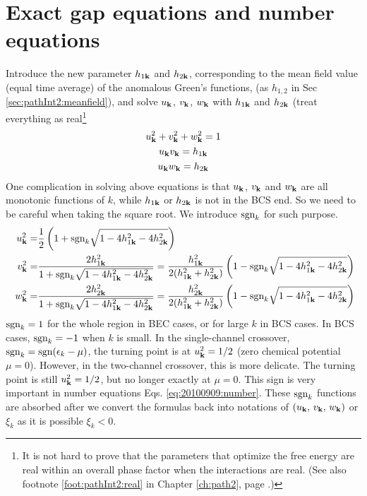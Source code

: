  \section{Exact gap equations and number equations}
Introduce the new parameter $h_{1\mathbf{k}}$ and $h_{2\mathbf{k}}$, corresponding to the mean field value (equal time average) of the anomalous Green's functions,  (as $h_{1,2}$  in Sec \ref{sec:pathInt2:meanfield}), and solve $u_{\mathbf{k}}$, $v_{\mathbf{k}}$, $w_{\mathbf{k}}$ with $h_{1\mathbf{k}}$ and $h_{2\mathbf{k}}$ (treat everything as real\footnote{It is not hard to prove that the parameters that optimize the free energy are real within an overall phase factor when the interactions are real. (See also footnote \ref{foot:pathInt2:real} in Chapter \ref{ch:path2}, page \pageref{foot:pathInt2:real}.)}
\begin{gather}
u_{\mathbf{k}}^2+v^{2}_{\mathbf{k}}+w^{2}_{\mathbf{k}}=1\\
u_{\mathbf{k}}v_{\mathbf{k}}=h_{1\mathbf{k}}\\
u_{\mathbf{k}}w_{\mathbf{k}}=h_{2\mathbf{k}}
\end{gather}
One complication in solving above equations is that $u_{\mathbf{k}}$, $v_{\mathbf{k}}$ and  $w_{\mathbf{k}}$ are all  monotonic functions of $k$, while $h_{1\mathbf{k}}$ or $h_{2\mathbf{k}}$ is not in the BCS end.  So we need to be careful when taking the square root.  We introduce $\text{sgn}_k$ for such purpose.  
\begin{equation}
\begin{split}
u_{\mathbf{k}}^2=&\frac{1}{2} \left(1+\text{sgn}_{k}\sqrt{1-4 h_{1\mathbf{k}}^2-4 h_{2\mathbf{k}}^2}\right)\\
v^{2}_{\mathbf{k}}=&\frac{2 h_{1\mathbf{k}}^2}{1+\text{sgn}_{k}\sqrt{1-4 h_{1\mathbf{k}}^2-4 h_{2\mathbf{k}}^2}}
=\frac{ h_{1\mathbf{k}}^2}{2( h_{1\mathbf{k}}^2+ h_{2\mathbf{k}}^2)} \left(1-\text{sgn}_{k}\sqrt{1-4 h_{1\mathbf{k}}^2-4 h_{2\mathbf{k}}^2}\right)\\\
w^{2}_{\mathbf{k}}=&\frac{2 h_{2\mathbf{k}}^2}{1+\text{sgn}_{k}\sqrt{1-4 h_{1\mathbf{k}}^2-4 h_{2\mathbf{k}}^2}}
=\frac{h_{2\mathbf{k}}^2}{2( h_{1\mathbf{k}}^2+ h_{2\mathbf{k}}^2)} \left(1-\text{sgn}_{k}\sqrt{1-4 h_{1\mathbf{k}}^2-4 h_{2\mathbf{k}}^2}\right)
\end{split}
\end{equation}
{\label{foot:20100909:sgn}  $\text{sgn}_k=1$  for the whole region in BEC cases, or for large $k$ in BCS cases. In BCS cases,  $\text{sgn}_{k}=-1$ when $k$ is small.  In the single-channel crossover, $\text{sgn}_{k}=\text{sgn}(\epsilon_{k}-\mu)$, the turning point is at $u_{\mathbf{k}}^2=1/2$ (zero chemical potential $\mu=0$).  However, in the two-channel crossover, this is more delicate.  The turning point is still $u_{\mathbf{k}}^2=1/2$, but no longer exactly at $\mu=0$.  This sign  is very important in number equations Eqs. \ref{eq:20100909:number}.  These $\text{sgn}_{k}$ functions are absorbed after we convert the formulas back into notations of  $(u_{\mathbf{k}},\,v_{\mathbf{k}}, \,w_{\mathbf{k}})$ or $\xi_{k}$ as it is possible $\xi_{k}<0$.}


